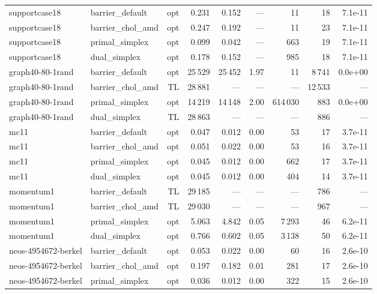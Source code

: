 \documentclass[11pt,a4paper]{article}
\begin{document}
\begin{table}[h]
\begin{tabular}{@{}llrrrrrrr@{}}
\midrule
supportcase18       & barrier\_default  & opt & 0.231 & 0.152 & ---  & 11      & 18  & 7.1e-11 \\
supportcase18       & barrier\_chol\_amd & opt & 0.247 & 0.192 & ---  & 11      & 23  & 7.1e-11 \\
supportcase18       & primal\_simplex   & opt & 0.099 & 0.042 & ---  & 663     & 19  & 7.1e-11 \\
supportcase18       & dual\_simplex     & opt & 0.178 & 0.152 & ---  & 985     & 18  & 7.1e-11 \\
\midrule
graph40-80-1rand    & barrier\_default  & opt & 25\,529 & 25\,452 & 1.97 & 11  & 8\,741 & 0.0e+00 \\
graph40-80-1rand    & barrier\_chol\_amd & TL & 28\,881 & ---   & ---  & ---     & 12\,533 & --- \\
graph40-80-1rand    & primal\_simplex   & opt & 14\,219 & 14\,148 & 2.00 & 614\,030 & 883 & 0.0e+00 \\
graph40-80-1rand    & dual\_simplex     & TL & 28\,863 & ---   & ---  & ---     & 886 & --- \\
\midrule
mc11                & barrier\_default  & opt & 0.047 & 0.012 & 0.00 & 53      & 17  & 3.7e-11 \\
mc11                & barrier\_chol\_amd & opt & 0.051 & 0.022 & 0.00 & 53      & 16  & 3.7e-11 \\
mc11                & primal\_simplex   & opt & 0.045 & 0.012 & 0.00 & 662     & 17  & 3.7e-11 \\
mc11                & dual\_simplex     & opt & 0.045 & 0.012 & 0.00 & 404     & 14  & 3.7e-11 \\
\midrule
momentum1           & barrier\_default  & TL & 29\,185 & ---   & ---  & ---     & 786 & --- \\
momentum1           & barrier\_chol\_amd & TL & 29\,030 & ---   & ---  & ---     & 967 & --- \\
momentum1           & primal\_simplex   & opt & 5.063 & 4.842 & 0.05 & 7\,293  & 46  & 6.2e-11 \\
momentum1           & dual\_simplex     & opt & 0.766 & 0.602 & 0.05 & 3\,138  & 50  & 6.2e-11 \\
\midrule
neos-4954672-berkel & barrier\_default  & opt & 0.053 & 0.022 & 0.00 & 60      & 16  & 2.6e-10 \\
neos-4954672-berkel & barrier\_chol\_amd & opt & 0.197 & 0.182 & 0.01 & 281     & 17  & 2.6e-10 \\
neos-4954672-berkel & primal\_simplex   & opt & 0.036 & 0.012 & 0.00 & 322     & 15  & 2.6e-10 \\

\end{tabular}
\end{table}
\end{document}
